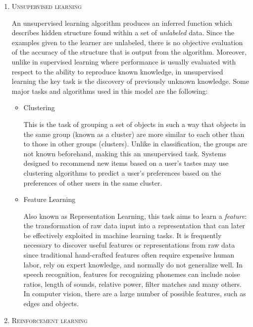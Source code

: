 \documentclass[12pt]{article}
\begin{document}
\begin{enumerate}
\newpage

\item
\textsc{Unsupervised learning} 

An unsupervised learning algorithm produces an inferred function which describes hidden structure found within a set of \textit{unlabeled} data. Since the examples given to the learner are unlabeled, there is no objective evaluation of the accuracy of the structure that is output from the algorithm. Moreover, unlike in supervised learning where performance is usually evaluated with respect to the ability to reproduce known knowledge, in unsupervised learning the key task is the discovery of previously unknown knowledge. Some major tasks and algorithms used in this model are the following:

\begin{itemize}
\renewcommand{\labelitemi}{\textbf{\textendash}}

    \item Clustering 
    
    This is the task of grouping a set of objects in such a way that objects in the same group (known as a cluster) are more similar to each other than to those in other groups (clusters). Unlike in classification, the groups are not known beforehand, making this an unsupervised task. Systems designed to recommend new items based on a user's tastes may use clustering algorithms to predict a user's preferences based on the preferences of other users in the same cluster.

    \item Feature Learning
    
    Also known as Representation Learning, this task aims to learn a \textit{feature}: the transformation of raw data input into a representation that can later be effectively exploited in machine learning tasks. It is frequently necessary to discover useful features or representations from raw data since traditional hand-crafted features often require expensive human labor, rely on expert knowledge, and normally do not generalize well. In speech recognition, features for recognizing phonemes can include noise ratios, length of sounds, relative power, filter matches and many others. In computer vision, there are a large number of possible features, such as edges and objects. 

\end{itemize}

\item
\textsc{Reinforcement learning}


\end{enumerate}
\end{document}
